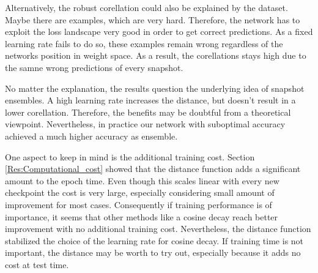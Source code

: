Alternatively, the robust corellation could also be explained by the dataset. Maybe
there are examples, which are very hard. Therefore, the network has to exploit
the loss landscape very good in order to get correct predictions. As a fixed
learning rate fails to do so, these examples remain wrong regardless of the
networks position in weight space. As a result, the corellations stays high due
to the samne wrong predictions of every snapshot.

No matter the explanation, the results question the underlying idea of snapshot
ensembles. A high learning rate increases the distance, but doesn't result in a
lower corellation. Therefore, the benefits may be doubtful from a theoretical
viewpoint. Nevertheless, in practice our network with suboptimal accuracy
achieved a much higher accuracy as ensemble. 
\newline

One aspect to keep in mind is the additional training cost. Section
\ref{Res:Computational_cost} showed that the distance function adds a
significant amount to the epoch time. Even though this scales linear with every
new checkpoint the cost is very large, especially considering small amount of
improvement for most cases. Consequently if training performance is of
importance, it seems that other methods like a cosine decay reach better
improvement with no additional training cost. Nevertheless, the distance
function stabilized the choice of the learning rate for cosine decay. If
training time is not important, the distance may be worth to try out, especially
because it adds no cost at test time.



